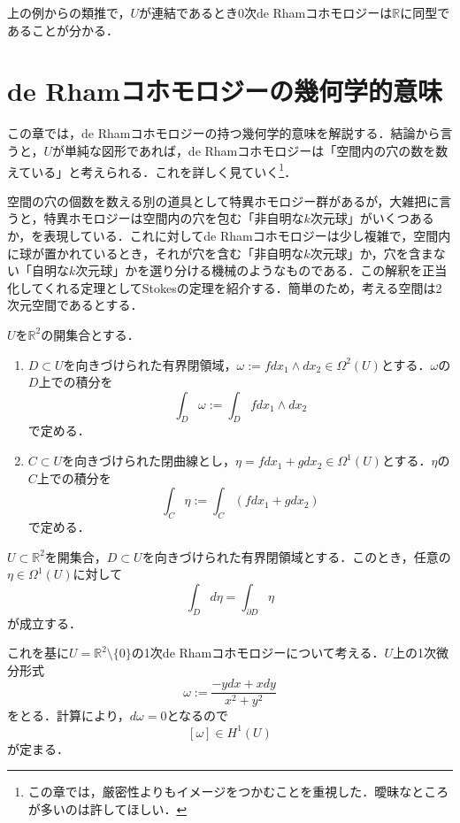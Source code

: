 \documentclass[uplatex]{jsarticle}
\begin{document}
\begin{remark}
上の例からの類推で，$U$が連結であるとき0次de Rhamコホモロジーは$\mathbb{R}$に同型であることが分かる．
\end{remark}
\section{de Rhamコホモロジーの幾何学的意味}
この章では，de Rhamコホモロジーの持つ幾何学的意味を解説する．結論から言うと，$U$が単純な図形であれば，de Rhamコホモロジーは「空間内の穴の数を数えている」と考えられる．これを詳しく見ていく\footnote{この章では，厳密性よりもイメージをつかむことを重視した．曖昧なところが多いのは許してほしい．}．

空間の穴の個数を数える別の道具として特異ホモロジー群があるが，大雑把に言うと，特異ホモロジーは空間内の穴を包む「非自明な$k$次元球」がいくつあるか，を表現している．これに対してde Rhamコホモロジーは少し複雑で，空間内に球が置かれているとき，それが穴を含む「非自明な$k$次元球」か，穴を含まない「自明な$k$次元球」かを選り分ける機械のようなものである．この解釈を正当化してくれる定理としてStokesの定理を紹介する．簡単のため，考える空間は2次元空間であるとする．

\begin{definition}[微分形式の積分]
$U$を$\mathbb{R}^2$の開集合とする．
\begin{enumerate}[label=(\arabic*)]
\item $D\subset U$を向きづけられた有界閉領域，$\omega:=fdx_1\wedge dx_2\in \Omega^2(U)$とする．$\omega$の$D$上での積分を
\[ \int_D \omega :=\int_D fdx_1\wedge dx_2 \]
で定める．
\item $C\subset U$を向きづけられた閉曲線とし，$\eta=fdx_1+gdx_2\in \Omega^1(U)$とする．$\eta$の$C$上での積分を
\[ \int_C \eta := \int_C (fdx_1+gdx_2) \]
で定める．
\end{enumerate}
\end{definition}
\begin{theorem}[Stokesの定理]
$U\subset \mathbb{R}^2$を開集合，$D\subset U$を向きづけられた有界閉領域とする．このとき，任意の$\eta\in \Omega^1(U)$に対して
\[ \int_D d\eta = \int_{\partial D} \eta \]
が成立する．
\end{theorem}
これを基に$U=\mathbb{R}^2\setminus \{0\}$の1次de Rhamコホモロジーについて考える．$U$上の1次微分形式
\[ \omega:=\frac{-ydx+xdy}{x^2+y^2} \]
をとる．計算により，$d\omega=0$となるので
\[ [\omega]\in H^1(U) \]
が定まる．
\end{document}
